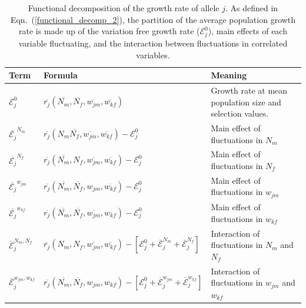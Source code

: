 \documentclass[12pt]{article}
\begin{document}
\begin{table}[h]
\fontsize{7}{12}\selectfont %
    \centering
      \caption{Functional decomposition of the growth rate of allele $j$. As defined in Eqn.~(\ref{functional_decomp_2}), the partition of the average population growth rate is made up of the variation free growth rate ($\mathcal{E}^{0}_{j}$), main effects of each variable fluctuating, and the interaction between fluctuations in correlated variables. }
  \resizebox{\textwidth}{!} {\begin{tabular}{l|l|l}
  \toprule
        Term & Formula & Meaning \\
        \hline
         $\mathcal{E}^{0}_{j}$ & $\overline{r_{j}} (\overline{N_{m}}, \overline{N_{f}}, \overline{w_{jm}}, \overline{w_{kf}})$ & Growth rate at mean population size and selection values. \\


         $\overline{\mathcal{E}_{j}}^{N_{m}}$ & $\overline{r_{j}}(N_{m} \overline{N_{f}}, \overline{w_{jm}}, \overline{w_{kf}}) - \mathcal{E}^{0}_{j} $ & Main effect of fluctuations in $N_{m}$\\

         $\overline{\mathcal{E}_{j}}^{N_{f}}$ & $ \overline{r_{j}}( \overline{N_{m}}, N_{f},\overline{w_{jm}}, \overline{w_{kf}}) - \mathcal{E}^{0}_{j}$ & Main effect of fluctuations in $N_{f}$ \\

        $\overline{\mathcal{E}_{j}}^{w_{jm}}$ & $ \overline{r_{j}}(\overline{N_{m}}, \overline{N_{f}}, w_{jm}, \overline{w_{kf}}) - \mathcal{E}^{0}_{j}$& Main effect of fluctuations in $w_{jm}$\\

        $\overline{\mathcal{E}_{j}}^{w_{kf}}$ & $ \overline{r_{j}}(\overline{N_{m}}, \overline{N_{f}}, \overline{w_{jm}}, w_{kf})- \mathcal{E}^{0}_{j}$ & Main effect of fluctuations in $w_{kf}$\\

        $\overline{\mathcal{E}}^{N_{m},N_{f}}_{j}$ & $ \overline{r_{j}}(N_{m}, N_{f}, \overline{w_{jm}}, \overline{w_{kf}})- [\mathcal{E}^{0}_{j} +\overline{\mathcal{E}}^{N_{m}}_{j}+\overline{\mathcal{E}}^{N_{f}}_{j}]$ & Interaction of fluctuations in $N_{m}$ and $N_{f}$\\

        $\overline{\mathcal{E}}^{w_{jm},w_{kf}}_{j}$ & $ \overline{r_{j}}(\overline{N_{m}}, \overline{N_{f}}, w_{jm}, w_{kf})- [\mathcal{E}^{0}_{j} +\overline{\mathcal{E}}^{w_{jm}}_j+\overline{\mathcal{E}}^{w_{kf}}_{j}]$ & Interaction of fluctuations in $w_{jm}$ and $w_{kf}$ \\


\end{tabular}}
\end{table}
\end{document}
